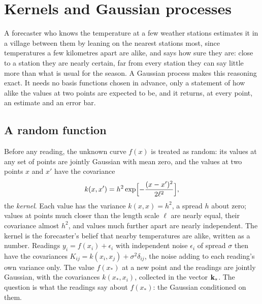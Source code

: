 \section{Kernels and Gaussian processes}
\label{sec:lo-gp}

A forecaster who knows the temperature at a few weather stations
estimates it in a village between them by leaning on the nearest
stations most, since temperatures a few kilometres apart are alike, and
says how sure they are: close to a station they are nearly certain, far
from every station they can say little more than what is usual for the
season. A Gaussian process makes this reasoning exact. It needs no basis
functions chosen in advance, only a statement of how alike the values at
two points are expected to be, and it returns, at every point, an
estimate and an error bar.

\subsection*{A random function}

Before any reading, the unknown curve $f(x)$ is treated as random: its
values at any set of points are jointly Gaussian with mean zero, and the
values at two points $x$ and $x'$ have the covariance
\begin{equation}
   k(x, x') = h^2\exp\Bigl[-\frac{(x - x')^2}{2\ell^2}\Bigr] ,
   \label{eq:lo-kernel}
\end{equation}
the \emph{kernel}. Each value has the variance $k(x, x) = h^2$, a spread
$h$ about zero; values at points much closer than the length scale $\ell$
are nearly equal, their covariance almost $h^2$, and values much further
apart are nearly independent. The kernel is the forecaster's belief that
nearby temperatures are alike, written as a number. Readings $y_i =
f(x_i) + \epsilon_i$ with independent noise $\epsilon_i$ of spread
$\sigma$ then have the covariances $K_{ij} = k(x_i, x_j) +
\sigma^2\delta_{ij}$, the noise adding to each reading's own variance
only. The value $f(x_\ast)$ at a new point and the readings are jointly
Gaussian, with the covariances $k(x_\ast, x_i)$, collected in the vector
$\bm{\mathrm{k}}_\ast$. The question is what the readings say about $f(x_\ast)$:
the Gaussian conditioned on them.

